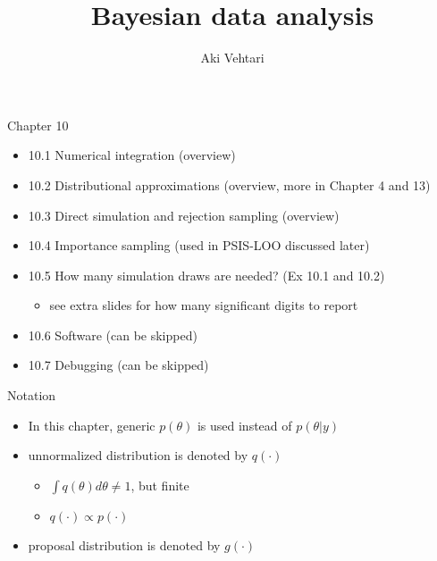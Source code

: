 \documentclass[finnish,english,t]{beamer}
\title[]{Bayesian data analysis}
\subtitle{}
\author{Aki Vehtari}
\institute[Aalto]{}
\begin{document}
\begin{frame}
  
  {\Large\color{navyblue} Chapter 10}

  \begin{itemize}
\item 10.1 Numerical integration (overview)
\item 10.2 Distributional approximations (overview, more in Chapter 4 and 13)
\item 10.3 Direct simulation and rejection sampling (overview)
\item 10.4 Importance sampling (used in PSIS-LOO discussed later)
\item 10.5 How many simulation draws are needed? (Ex 10.1 and 10.2)
  \begin{itemize}
  \item see extra slides for how many significant digits to report
  \end{itemize}
\item 10.6 Software (can be skipped)
\item 10.7 Debugging (can be skipped)
   \end{itemize}
\end{frame}

\begin{frame}
  
  {\Large\color{navyblue} Notation}

  \begin{itemize}
  \item In this chapter, generic $p(\theta)$ is used instead of
    $p(\theta|y)$
  \item unnormalized distribution is denoted by $q(\cdot)$
    \begin{itemize}
    \item $\int q(\theta) d\theta \neq 1$, but finite
    \item $q(\cdot) \propto p(\cdot)$
    \end{itemize}
  \item proposal distribution is denoted by $g(\cdot)$
  \end{itemize}

\end{frame}
\end{document}
